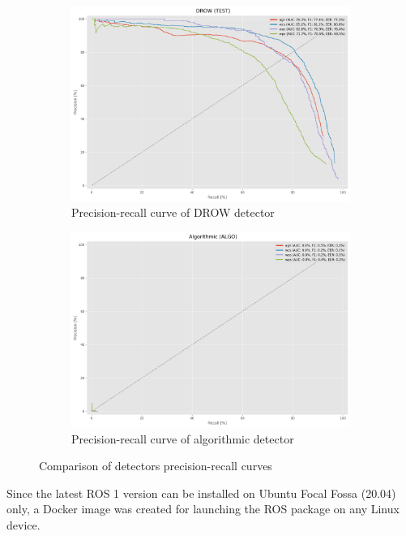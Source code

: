 \documentclass{article}
\begin{document}
\begin{figure}[t!]
	\centering
	\begin{subfigure}{.5\textwidth}
		\centering
		\includegraphics[width=.9\linewidth]{pr_auc_drow}
		\caption{Precision-recall curve of DROW detector}
		\label{fig:pr_auc_drow}
	\end{subfigure}%
	\begin{subfigure}{.5\textwidth}
		\centering
		\includegraphics[width=.9\linewidth]{pr_auc_algo}
		\caption{Precision-recall curve of algorithmic detector}
		\label{fig:pr_auc_algo}
	\end{subfigure}
	\caption{Comparison of detectors precision-recall curves}
	\label{fig:pr_auc_comparison}
\end{figure}

Since the latest ROS 1 version can be installed on Ubuntu Focal Fossa (20.04) only\cite{ros_latest_installation}\cite{ros_latest_package}, a Docker image was created for launching the ROS package on any Linux device.
\end{document}
